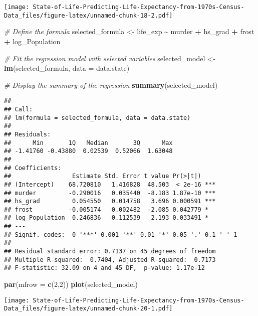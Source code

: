 \documentclass[
]{article}
\newenvironment{Shaded}{\begin{snugshade}}{\end{snugshade}}
\newcommand{\AttributeTok}[1]{\textcolor[rgb]{0.13,0.29,0.53}{#1}}
\newcommand{\CommentTok}[1]{\textcolor[rgb]{0.56,0.35,0.01}{\textit{#1}}}
\newcommand{\DecValTok}[1]{\textcolor[rgb]{0.00,0.00,0.81}{#1}}
\newcommand{\FunctionTok}[1]{\textcolor[rgb]{0.13,0.29,0.53}{\textbf{#1}}}
\newcommand{\NormalTok}[1]{#1}
\newcommand{\OtherTok}[1]{\textcolor[rgb]{0.56,0.35,0.01}{#1}}
\newcommand{\SpecialCharTok}[1]{\textcolor[rgb]{0.81,0.36,0.00}{\textbf{#1}}}
\begin{document}
\texttt{[image: State-of-Life-Predicting-Life-Expectancy-from-1970s-Census-Data\_files/figure-latex/unnamed-chunk-18-2.pdf]}

\begin{Shaded}
\begin{Highlighting}[]
\CommentTok{\# Define the formula}
\NormalTok{selected\_formula }\OtherTok{\textless{}{-}}\NormalTok{ life\_exp }\SpecialCharTok{\textasciitilde{}}\NormalTok{ murder }\SpecialCharTok{+}\NormalTok{ hs\_grad }\SpecialCharTok{+}\NormalTok{ frost }\SpecialCharTok{+}\NormalTok{ log\_Population}

\CommentTok{\# Fit the regression model with selected variables}
\NormalTok{selected\_model }\OtherTok{\textless{}{-}} \FunctionTok{lm}\NormalTok{(selected\_formula, }\AttributeTok{data =}\NormalTok{ data.state)}

\CommentTok{\# Display the summary of the regression}
\FunctionTok{summary}\NormalTok{(selected\_model)}
\end{Highlighting}
\end{Shaded}

\begin{verbatim}
## 
## Call:
## lm(formula = selected_formula, data = data.state)
## 
## Residuals:
##      Min       1Q   Median       3Q      Max 
## -1.41760 -0.43880  0.02539  0.52066  1.63048 
## 
## Coefficients:
##                 Estimate Std. Error t value Pr(>|t|)    
## (Intercept)    68.720810   1.416828  48.503  < 2e-16 ***
## murder         -0.290016   0.035440  -8.183 1.87e-10 ***
## hs_grad         0.054550   0.014758   3.696 0.000591 ***
## frost          -0.005174   0.002482  -2.085 0.042779 *  
## log_Population  0.246836   0.112539   2.193 0.033491 *  
## ---
## Signif. codes:  0 '***' 0.001 '**' 0.01 '*' 0.05 '.' 0.1 ' ' 1
## 
## Residual standard error: 0.7137 on 45 degrees of freedom
## Multiple R-squared:  0.7404, Adjusted R-squared:  0.7173 
## F-statistic: 32.09 on 4 and 45 DF,  p-value: 1.17e-12
\end{verbatim}

\begin{Shaded}
\begin{Highlighting}[]
\FunctionTok{par}\NormalTok{(}\AttributeTok{mfrow =} \FunctionTok{c}\NormalTok{(}\DecValTok{2}\NormalTok{,}\DecValTok{2}\NormalTok{))}
\FunctionTok{plot}\NormalTok{(selected\_model)}
\end{Highlighting}
\end{Shaded}

\texttt{[image: State-of-Life-Predicting-Life-Expectancy-from-1970s-Census-Data\_files/figure-latex/unnamed-chunk-20-1.pdf]}
\end{document}

